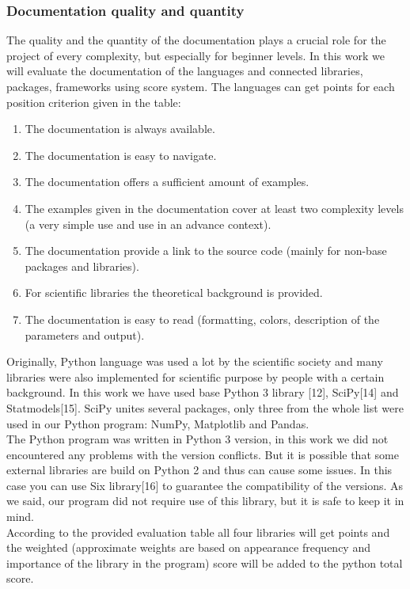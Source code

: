 \documentclass{article}
\begin{document}
\subsubsection{Documentation quality and quantity}
The quality and the quantity of the documentation plays a crucial role for the project of every complexity, but especially for beginner levels. In this work we will evaluate the documentation of the languages and connected libraries, packages, frameworks using score system. The languages can get points for each position criterion given in the table:
\begin{enumerate}
    \item The documentation is always available.
    \item The documentation is easy to navigate.
    \item The documentation offers a sufficient amount of examples.
    \item The examples given in the documentation cover at least two complexity levels (a very simple use and use in an advance context).
    \item The documentation provide a link to the source code (mainly for non-base packages and libraries).
    \item For scientific libraries the theoretical background is provided.
    \item The documentation is easy to read (formatting, colors, description of the parameters and output).
\end{enumerate}
Originally, Python language was used a lot by the scientific society and many libraries were also implemented for scientific purpose by people with a certain background. In this work we have used base Python 3 library [12],  SciPy[14] and Statmodels[15]. SciPy unites several packages, only three from the whole list were used in our Python program: NumPy, Matplotlib and Pandas.\\
The Python program was written in Python 3 version, in this work we did not encountered any problems with the version conflicts. But it is possible that some external libraries are build on Python 2 and thus can cause some issues. In this case you can use Six library[16] to guarantee the compatibility of the versions. As we said, our program did not require use of this library, but it is safe to keep it in mind.\\
According to the provided evaluation table all four libraries will get points and the weighted (approximate weights are based on appearance frequency and importance of the library in the program) score will be added to the python total score.\\
\end{document}
